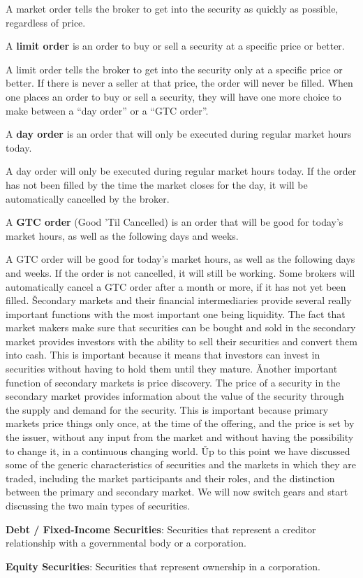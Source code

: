 A market order tells the broker to get into the security as quickly as possible, regardless of price.

A \textbf{limit order} is an order to buy or sell a security at a specific price or better.
\ed

A limit order tells the broker to get into the security only at a specific price or better. If there is never a seller
at that price, the order will never be filled. \v

When one places an order to buy or sell a security, they will have one more choice to make between a ``day order'' or
a ``GTC order''.

A \textbf{day order} is an order that will only be executed during regular market hours today.
\ed

A day order will only be executed during regular market hours today. If the order has not been filled by the time the
market closes for the day, it will be automatically cancelled by the broker.

A \textbf{GTC order} (Good 'Til Cancelled) is an order that will be good for today's market hours, as well as the
following days and weeks.
\ed

A GTC order will be good for today's market hours, as well as the following days and weeks. If the order is not
cancelled, it will still be working. Some brokers will automatically cancel a GTC order after a month or more, if it
has not yet been filled. \v

Secondary markets and their financial intermediaries provide several really important functions with the most important
one being liquidity. The fact that market makers make sure that securities can be bought and sold in the secondary
market provides investors with the ability to sell their securities and convert them into cash. This is important
because it means that investors can invest in securities without having to hold them until they mature. \v

Another important function of secondary markets is price discovery. The price of a security in the secondary market
provides information about the value of the security through the supply and demand for the security. This is important
because primary markets price things only once, at the time of the offering, and the price is set by the issuer,
without any input from the market and without having the possibility to change it, in a continuous changing world. \v

Up to this point we have discussed some of the generic characteristics of securities and the markets in which they are
traded, including the market participants and their roles, and the distinction between the primary and secondary market.
We will now switch gears and start discussing the two main types of securities.
\bit
\item \textbf{Debt / Fixed-Income Securities}: Securities that represent a creditor relationship with a governmental
body or a corporation.
\item \textbf{Equity Securities}: Securities that represent ownership in a corporation.
\eit

